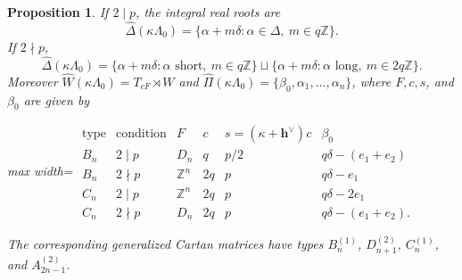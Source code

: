 \documentclass[11pt,a4paper]{amsart}
\newcommand{\ZZ}{\mathbb Z}
\theoremstyle{plain}
\newtheorem{prop}[theorem]{Proposition}
\numberwithin{equation}{section}
\begin{document}
\begin{prop}\label{prop:A-integral}
If $2\mid p$, the integral real roots are
\[
\widehat\Delta(\kappa\Lambda_0)
=\{\alpha+m\delta:\alpha\in\Delta,\ m\in q\ZZ\}.
\]
If $2\nmid p$, 
\[
\widehat\Delta(\kappa\Lambda_0)
=\{\alpha+m\delta:\alpha\text{ short},\ m\in q\ZZ\}
\sqcup
\{\alpha+m\delta:\alpha\text{ long},\ m\in2q\ZZ\}.
\]
Moreover $\widehat W(\kappa\Lambda_0)=T_{cF}\rtimes W$ and
$\widehat\Pi(\kappa\Lambda_0)=\{\beta_0,\alpha_1,\ldots,\alpha_n\}$,
where \(F,c,s\), and \(\beta_0\) are given by
\begin{center}
\begin{adjustbox}{max width=\textwidth}
\(
\begin{array}{c|c|c|c|c|c}
\text{type}&\text{condition}&F&c&s=(\kappa+\mathbf{h}^\vee)c&\beta_0\\ \hline
B_n&2\mid p&D_n&q&p/2&q\delta-(e_1+e_2)\\
B_n&2\nmid p&\ZZ^n&2q&p&q\delta-e_1\\
C_n&2\mid p&\ZZ^n&2q&p&q\delta-2e_1\\
C_n&2\nmid p&D_n&2q&p&q\delta-(e_1+e_2).
\end{array}
\)
\end{adjustbox}
\end{center}
The corresponding generalized Cartan matrices have types
\(B_n^{(1)}\), \(D_{n+1}^{(2)}\), \(C_n^{(1)}\), and
\(A_{2n-1}^{(2)}\).
\end{prop}
\end{document}
